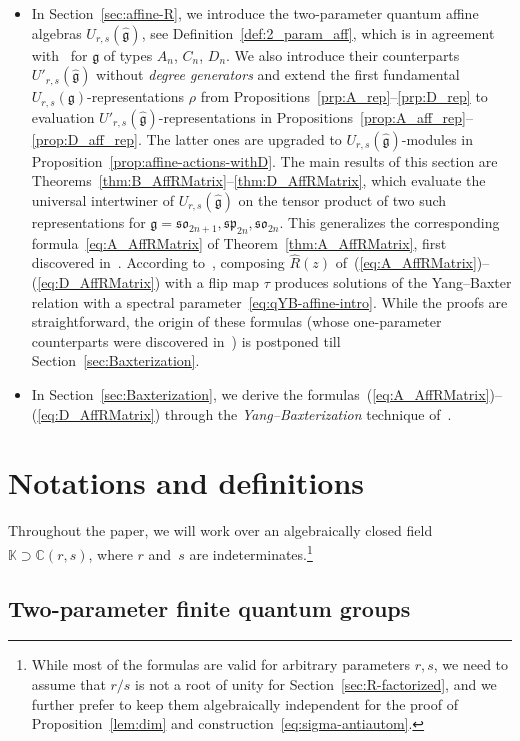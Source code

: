 \documentclass[pdftex]{sigma}
\numberwithin{equation}{section}
\newcommand{\fg}{\mathfrak{g}}
\newcommand{\sso}{\mathfrak{so}}
\newcommand{\ssp}{\mathfrak{sp}}
\newcommand{\uu}{U_{r,s}(\fg)}
\newcommand{\UU}{U_{r,s}(\widehat{\fg})}
\newcommand{\Uu}{U'_{r,s}(\widehat{\fg})}
\begin{document}
\begin{itemize}
\item[$\bullet$]
In Section~\ref{sec:affine-R}, we introduce the two-parameter quantum affine algebras $\UU$, see Definition~\ref{def:2_param_aff}, which is in agreement with~\cite{HRZ, HZ2,HZ1} for $\fg$ of types $A_n$, $C_n$, $D_n$. We also introduce their counterparts $\Uu$ without \emph{degree generators} and extend the first fundamental $\uu$-representations $\rho$ from Propositions~\ref{prp:A_rep}--\ref{prp:D_rep} to evaluation $\Uu$-representations in Propositions~\ref{prop:A_aff_rep}--\ref{prop:D_aff_rep}. The latter ones are upgraded to $\UU$-modules in Proposition~\ref{prop:affine-actions-withD}. The main results of this section are Theorems~\ref{thm:B_AffRMatrix}--\ref{thm:D_AffRMatrix}, which evaluate the universal intertwiner of $\UU$ on the tensor product of two such representations for $\fg=\sso_{2n+1},\ssp_{2n},\sso_{2n}$. This generalizes the corresponding formula~\eqref{eq:A_AffRMatrix} of Theorem~\ref{thm:A_AffRMatrix}, first discovered in~\cite{JL2}. According to~\cite{Jim}, composing $\hat{R}(z)$ of~(\ref{eq:A_AffRMatrix})--(\ref{eq:D_AffRMatrix}) with a flip map $\tau$ produces solutions of the Yang--Baxter relation with a spectral parameter~\eqref{eq:qYB-affine-intro}. While the proofs are straightforward, the origin of these formulas (whose one-parameter counterparts were discovered in~\cite{Jim}) is postponed till Section~\ref{sec:Baxterization}.

\item[$\bullet$]
In Section~\ref{sec:Baxterization}, we derive the formulas~(\ref{eq:A_AffRMatrix})--(\ref{eq:D_AffRMatrix}) through the \emph{Yang--Baxterization} technique of~\cite{GWX}.
\end{itemize}

\section{Notations and definitions}%

Throughout the paper, we will work over an algebraically closed field $\mathbb{K} \supset \mathbb{C}(r,s)$, where $r$ and~$s$ are indeterminates.\footnote{While most of the formulas
are valid for arbitrary parameters $r,s$, we need to assume that $r/s$ is not a root of unity for Section~\ref{sec:R-factorized}, and we further prefer to keep
them algebraically independent for the proof of Proposition~\ref{lem:dim} and construction~\eqref{eq:sigma-antiautom}.}

\subsection{Two-parameter finite quantum groups}\label{ssec:general-def}
\end{document}
